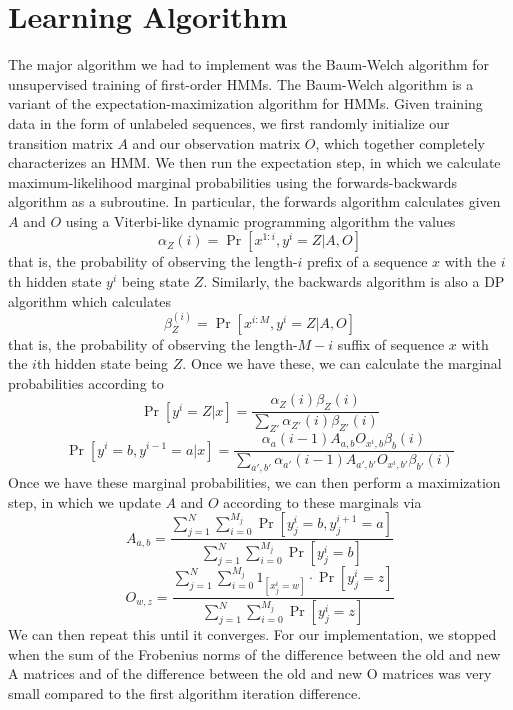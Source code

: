 \section{Learning Algorithm}
The major algorithm we had to implement was the Baum-Welch algorithm for unsupervised training of first-order HMMs. The Baum-Welch algorithm is a variant of the expectation-maximization algorithm for HMMs. Given training data in the form of unlabeled sequences, we first randomly initialize our transition matrix $A$ and our observation matrix $O$, which together completely characterizes an HMM. We then run the expectation step, in which we calculate maximum-likelihood marginal probabilities using the forwards-backwards algorithm as a subroutine. In particular, the forwards algorithm calculates given $A$ and $O$ using a Viterbi-like dynamic programming algorithm the values
$$\alpha_Z(i) = \Pr[x^{1 : i}, y^i = Z | A, O]$$
that is, the probability of observing the length-$i$ prefix of a sequence $x$ with the $i$th hidden state $y^i$ being state $Z$. Similarly, the backwards algorithm is also a DP algorithm which calculates
$$\beta_Z^(i) = \Pr[x^{i : M}, y^i = Z | A, O]$$
that is, the probability of observing the length-$M - i$ suffix of sequence $x$ with the $i$th hidden state being $Z$.
Once we have these, we can calculate the marginal probabilities according to
$$\Pr[y^i = Z | x] = \frac{\alpha_Z(i)\beta_Z(i)}{\sum_{Z'}{\alpha_{Z'}(i)\beta_{Z'}(i)}}$$
$$\Pr[y^i = b, y^{i - 1} = a | x] = \frac{\alpha_a(i - 1)A_{a, b}O_{x^i, b}\beta_b(i)}{\sum_{a', b'}{\alpha_{a'}(i - 1)A_{a', b'}O_{x^i, b'}\beta_{b'}(i)}}$$
Once we have these marginal probabilities, we can then perform a maximization step, in which we update $A$ and $O$ according to these marginals via
$$A_{a, b} = \frac{\sum_{j = 1}^{N}{\sum_{i = 0}^{M_j}{\Pr[y_j^i = b, y_j^{i + 1} = a]}}}{\sum_{j = 1}^{N}{\sum_{i = 0}^{M_j}{\Pr[y_j^i = b]}}}$$
$$O_{w, z} = \frac{\sum_{j = 1}^{N}{\sum_{i = 0}^{M_j}{1_{[x_j^i = w]} \cdot \Pr[y_j^i = z]}}}{\sum_{j = 1}^{N}{\sum_{i = 0}^{M_j}{\Pr[y_j^i = z]}}}$$
We can then repeat this until it converges. For our implementation, we stopped when the sum of the Frobenius norms of the difference between the old and new A matrices and of the difference between the old and new O matrices was very small compared to the first algorithm iteration difference.

